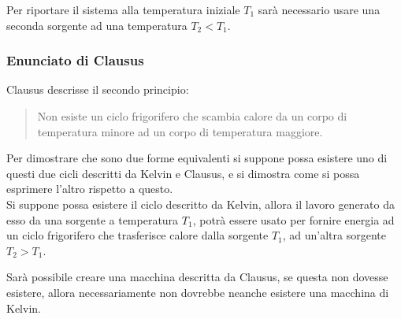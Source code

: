 \documentclass{article}
\numberwithin{equation}{subsection}
\begin{document}
Per riportare il sistema alla temperatura 
iniziale $T_1$ sarà necessario usare una seconda sorgente ad 
una temperatura $T_2<T_1$. 

\subsubsection{Enunciato di Clausus}


Clausus descrisse il secondo principio: 
\begin{quotation}
    Non esiste un ciclo frigorifero che scambia calore da un corpo 
    di temperatura minore ad un corpo di temperatura maggiore.
\end{quotation}

\begin{center}\end{center}

Per dimostrare che sono due forme equivalenti si suppone possa esistere 
uno di questi due cicli descritti da Kelvin e Clausus, e si dimostra come si possa esprimere l'altro rispetto a questo. 
\\
Si suppone possa esistere il ciclo descritto da Kelvin, allora il lavoro 
generato da esso da una sorgente a temperatura $T_1$, potrà essere usato per 
fornire energia ad un ciclo frigorifero che trasferisce calore dalla 
sorgente $T_1$, ad un'altra sorgente $T_2>T_1$. 

Sarà possibile creare una 
macchina descritta da Clausus, se questa non dovesse esistere, allora 
necessariamente non dovrebbe neanche esistere una macchina di Kelvin.
\end{document}
